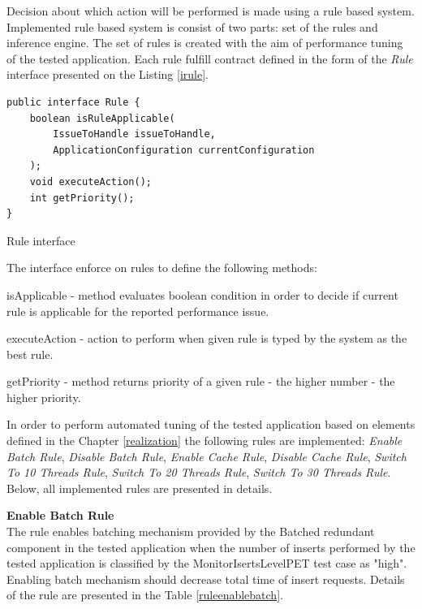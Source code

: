 \documentclass[10pt,a4paper]{article}
\let\tempone\itemize
\let\temptwo\enditemize
\renewenvironment{itemize}{\tempone\addtolength{\itemsep}{-0.4\baselineskip}}{\temptwo}
\begin{document}
Decision about which action will be performed is made using a rule based system. Implemented rule based system is consist of two parts: set of the rules and inference engine. The set of rules is created with the aim of performance tuning of the tested application. Each rule fulfill contract defined in the form of the \textit{Rule} interface presented on the Listing \ref{irule}.

\begin{listing}[ht]\begin{verbatim}
public interface Rule {
    boolean isRuleApplicable(
    	IssueToHandle issueToHandle, 
    	ApplicationConfiguration currentConfiguration
    );
    void executeAction();
    int getPriority();
}
\end{verbatim}
\caption{Rule interface} \label{irule}
\end{listing}

The interface enforce on rules to define the following methods: 
\begin{itemize}
\item isApplicable - method evaluates boolean condition in order to decide if current rule is applicable for the reported performance issue.   
\item executeAction - action to perform when given rule is typed by the system as the best rule.   
\item getPriority - method returns priority of a given rule - the higher number - the higher priority.  
\end{itemize}

In order to perform automated tuning of the tested application based on elements defined in the Chapter \ref{realization} the following rules are implemented: \textit{Enable Batch Rule}, \textit{Disable Batch Rule}, \textit{Enable Cache Rule}, \textit{Disable Cache Rule}, \textit{Switch To 10 Threads Rule}, \textit{Switch To 20 Threads Rule}, \textit{Switch To 30 Threads Rule}. Below, all implemented rules are presented in details.  

\vspace{5mm}

\noindent\textbf{Enable Batch Rule} \\
The rule enables batching mechanism provided by the Batched redundant component in the tested application when the number of  inserts performed by the tested application is classified by the MonitorIsertsLevelPET test case as "high". Enabling batch mechanism should decrease total time of insert requests. Details of the rule are presented in the Table \ref{ruleenablebatch}.
\end{document}
